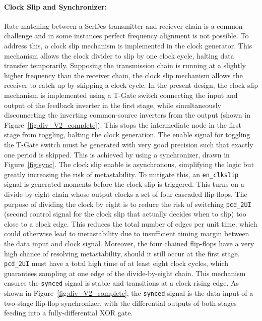 \paragraph{Clock Slip and Synchronizer:}
Rate-matching between a SerDes transmitter and reciever chain is a common challenge and in some instances perfect frequency alignment is not possible. To address this, a clock slip mechanism is implemented in the clock generator. This mechanism allows the clock divider to slip by one clock cycle, halting data transfer temporarily.
Supposing the transmission chain is running at a slightly higher frequency than the receiver chain, the clock slip mechanism allows the receiver to catch up by skipping a clock cycle. 
In the present design, the clock slip mechanism is implemented using a T-Gate switch connecting the input and output of the feedback inverter in the first stage, while simultaneously disconnecting the inverting common-source inverters from the output (shown in Figure~\ref{fig:div_V2_complete}). This stops the intermediate node in the first stage from toggling, halting the clock generation.
The enable signal for toggling the T-Gate switch must be generated with very good precision such that exactly one period is skipped. This is achieved by using a synchronizer, drawn in Figure~\ref{fig:sync}.
The clock slip enable is asynchronous, simplifying the logic but greatly increasing the risk of metastability. 
To mitigate this, an \texttt{en\_clkslip} signal is generated moments before the clock slip is triggered. This turns on a divide-by-eight chain whose output clocks a set of four cascaded flip-flops. 
The purpose of dividing the clock by eight is to reduce the risk of switching \texttt{pcd\_2UI} (second control signal for the clock slip that actually decides when to slip) too close to a clock edge. This reduces the total number of edges per unit time, which could otherwise lead to metastability due to insufficient timing margin between the data input and clock signal. 
Moreover, the four chained flip-flops have a very high chance of resolving metastability, should it still occur at the first stage. \texttt{pcd\_2UI} must have a total high time of at least eight clock cycles, which guarantees sampling at one edge of the divide-by-eight chain.
This mechanism ensures the \texttt{synced} signal is stable and transitions at a clock rising edge.
As shown in Figure~\ref{fig:div_V2_complete}, the \texttt{synced} signal is the data input of a two-stage flip-flop synchronizer, with the differential outputs of both stages feeding into a fully-differential XOR gate.
